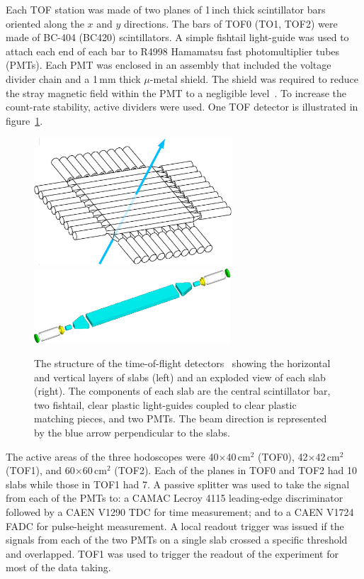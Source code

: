Each TOF station was made of two planes of 1\,inch thick scintillator
bars oriented along the $x$ and $y$ directions. 
The bars of TOF0 (TO1, TOF2) were made of BC-404 (BC420) scintillators.
A simple fishtail light-guide was used to attach each end of each bar
to R4998 Hamamatsu fast photomultiplier tubes (PMTs).
Each PMT was enclosed in an assembly that included the voltage divider
chain and a 1\,mm thick $\mu$-metal shield.
The shield was required to reduce the stray magnetic field within the
PMT to a negligible level~\cite{2010NIMPA.615...14B}.
To increase the count-rate stability, active dividers were used.
One TOF detector is illustrated in figure~\ref{fig:tof:schematic}.
\begin{figure}[htb]
  \begin{center}
    \includegraphics[width=7.4cm]{tof_diagram2-with_beam}
    \includegraphics[height=2.8cm]{slab_design2}
  \end{center}
  \caption{
    The structure of the time-of-flight
    detectors~\cite{2010NIMPA.615...14B,NOTE145} showing the
    horizontal and vertical layers of slabs (left) and an exploded
    view of each slab (right). 
    The components of each slab are the central scintillator bar, two
    fishtail, clear plastic light-guides coupled to clear plastic
    matching pieces, and two PMTs.
    The beam direction is represented by the blue arrow perpendicular to the slabs.
  }
  \label{fig:tof:schematic}
\end{figure}

The active areas of the three hodoscopes were 40$\times$40\,cm$^2$
(TOF0), 42$\times$42\,cm$^2$ (TOF1), and 60$\times$60\,cm$^2$ (TOF2).
Each of the planes in TOF0 and TOF2 had 10 slabs while those in TOF1 had 7.
A passive splitter was used to take the signal from each of the PMTs
to: a CAMAC Lecroy 4115 leading-edge discriminator followed by a CAEN
V1290 TDC for time measurement; and to a CAEN V1724 FADC for
pulse-height measurement.
A local readout trigger was issued if the signals from each of the two
PMTs on a single slab crossed a specific threshold and overlapped.
TOF1 was used to trigger the readout of the experiment for most of the
data taking. \\

